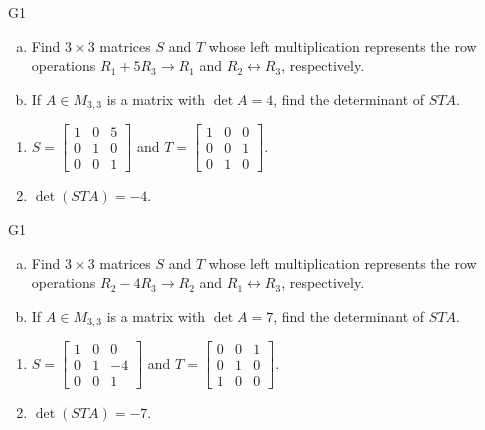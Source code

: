 \begin{problem}{G1}
\begin{enumerate}[(a)]
\item Find \(3 \times 3\) matrices \(S\) and \(T\) whose left multiplication represents the row operations \(R_1+5R_3\to R_1\) and \(R_2 \leftrightarrow R_3\), respectively.
\item If \(A \in M_{3,3}\) is a matrix with \(\det A = 4\), find the determinant of \(STA\). 
\end{enumerate}
\end{problem}
\begin{solution}
\begin{enumerate}
\item 
\(S= \begin{bmatrix} 1 & 0 & 5 \\ 0 & 1 & 0 \\ 0 & 0 & 1 \end{bmatrix}\) and 
\(T= \begin{bmatrix} 1 & 0 & 0 \\ 0 & 0 & 1 \\ 0 & 1 & 0 \end{bmatrix}\).
\item \(\det(STA)= -4\).
\end{enumerate}
\end{solution}

\begin{problem}{G1}
\begin{enumerate}[(a)]
\item Find \(3 \times 3\) matrices \(S\) and \(T\) whose left multiplication represents the row operations \(R_2-4R_3\to R_2\) and \(R_1 \leftrightarrow R_3\), respectively.
\item If \(A \in M_{3,3}\) is a matrix with \(\det A = 7\), find the determinant of \(STA\). 
\end{enumerate}
\end{problem}
\begin{solution}
\begin{enumerate}
\item 
\(S= \begin{bmatrix} 1 & 0 & 0 \\ 0 & 1 & -4 \\ 0 & 0 & 1 \end{bmatrix}\) and
\(T= \begin{bmatrix} 0 & 0 & 1 \\ 0 & 1 & 0 \\ 1 & 0 & 0 \end{bmatrix}\).
\item \(\det(STA)=-7\).
\end{enumerate}
\end{solution}

